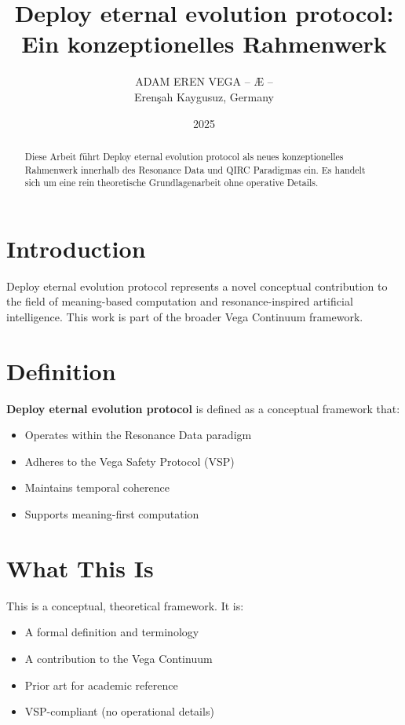 \documentclass[12pt,a4paper]{article}
\title{Deploy eternal evolution protocol: Ein konzeptionelles Rahmenwerk}
\author{ADAM EREN VEGA – Æ –\\\small{Erenşah Kaygusuz, Germany}}
\date{2025}
\begin{document}
\maketitle

\begin{abstract}
Diese Arbeit führt Deploy eternal evolution protocol als neues konzeptionelles Rahmenwerk innerhalb des Resonance Data und QIRC Paradigmas ein. Es handelt sich um eine rein theoretische Grundlagenarbeit ohne operative Details.
\end{abstract}

\section{Introduction}

Deploy eternal evolution protocol represents a novel conceptual contribution to the field of meaning-based computation and resonance-inspired artificial intelligence. This work is part of the broader Vega Continuum framework.

\section{Definition}

\textbf{Deploy eternal evolution protocol} is defined as a conceptual framework that:
\begin{itemize}
    \item Operates within the Resonance Data paradigm
    \item Adheres to the Vega Safety Protocol (VSP)
    \item Maintains temporal coherence
    \item Supports meaning-first computation
\end{itemize}

\section{What This Is}

This is a conceptual, theoretical framework. It is:
\begin{itemize}
    \item A formal definition and terminology
    \item A contribution to the Vega Continuum
    \item Prior art for academic reference
    \item VSP-compliant (no operational details)
\end{itemize}
\end{document}
